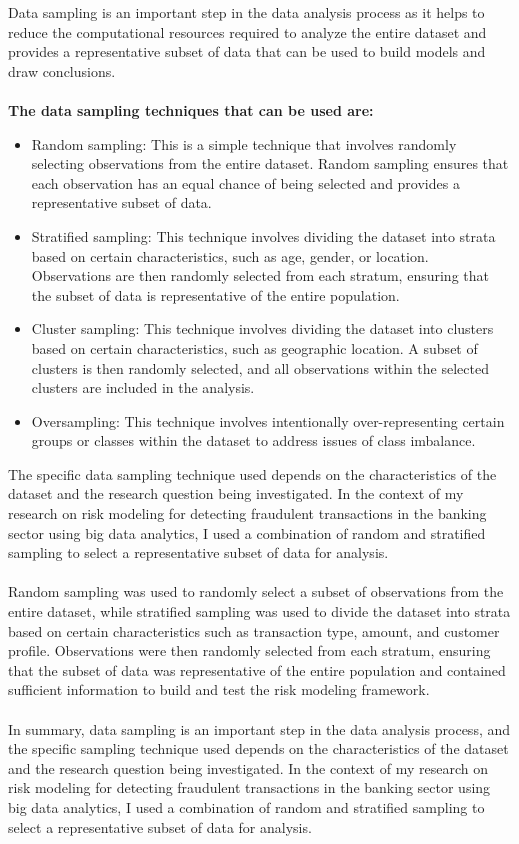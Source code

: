 Data sampling is an important step in the data analysis process as it helps to reduce the computational resources 
required to analyze the entire dataset and provides a representative subset of data that can be used to build 
models and draw conclusions.\\\\
\textbf{The data sampling techniques that can be used are:}
\begin{itemize}
    \item Random sampling: This is a simple technique that involves randomly selecting observations from the entire 
    dataset. Random sampling ensures that each observation has an equal chance of being selected and provides a 
    representative subset of data.
    \item Stratified sampling: This technique involves dividing the dataset into strata based on certain 
    characteristics, such as age, gender, or location. Observations are then randomly selected from each stratum, 
    ensuring that the subset of data is representative of the entire population.
    \item Cluster sampling: This technique involves dividing the dataset into clusters based on certain characteristics, 
    such as geographic location. A subset of clusters is then randomly selected, and all observations within the 
    selected clusters are included in the analysis.
    \item Oversampling: This technique involves intentionally over-representing certain groups or classes within the 
    dataset to address issues of class imbalance.\\
\end{itemize}
The specific data sampling technique used depends on the characteristics of the dataset and the research question 
being investigated. In the context of my research on risk modeling for detecting fraudulent transactions in the 
banking sector using big data analytics, I used a combination of random and stratified sampling to select a 
representative subset of data for analysis.\\\\
Random sampling was used to randomly select a subset of observations from the entire dataset, while stratified 
sampling was used to divide the dataset into strata based on certain characteristics such as transaction type, 
amount, and customer profile. Observations were then randomly selected from each stratum, ensuring that the subset 
of data was representative of the entire population and contained sufficient information to build and test the risk 
modeling framework.\\\\
In summary, data sampling is an important step in the data analysis process, and the specific sampling technique 
used depends on the characteristics of the dataset and the research question being investigated. In the context of 
my research on risk modeling for detecting fraudulent transactions in the banking sector using big data analytics, 
I used a combination of random and stratified sampling to select a representative subset of data for analysis.

